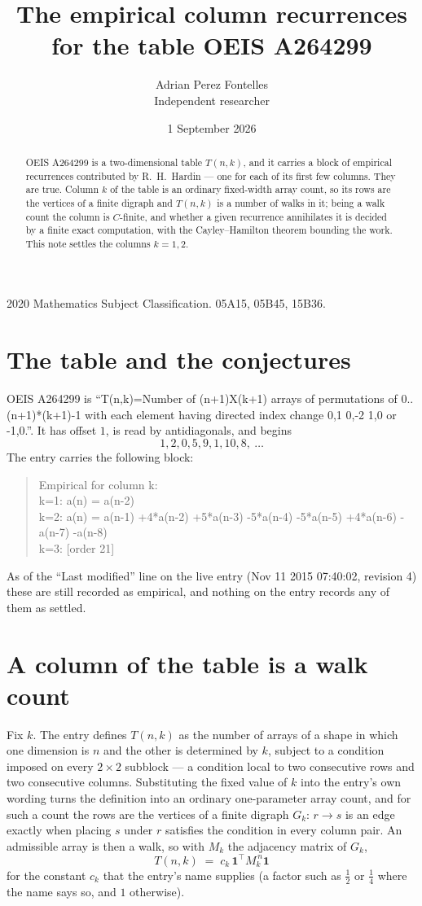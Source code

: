 \documentclass[11pt,a4paper]{article}
\title{The empirical column recurrences for the table OEIS A264299}
\author{Adrian Perez Fontelles\\ \small Independent researcher}
\date{1 September 2026}
\theoremstyle{plain}
\theoremstyle{definition}
\begin{document}
\maketitle

\begin{abstract}
OEIS A264299 is a two-dimensional table $T(n,k)$, and it carries a block of empirical
recurrences contributed by R.~H.~Hardin --- one for each of its first few columns. They are
true. Column $k$ of the table is an ordinary fixed-width array count, so its rows are the
vertices of a finite digraph and $T(n,k)$ is a number of walks in it; being a walk count the
column is $C$-finite, and whether a given recurrence annihilates it is decided by a finite
exact computation, with the Cayley--Hamilton theorem bounding the work. This note settles the columns $k=1, 2$.
\end{abstract}

\noindent\small 2020 Mathematics Subject Classification. 05A15, 05B45, 15B36.\normalsize

\section{The table and the conjectures}

OEIS A264299 is ``T(n,k)=Number of (n+1)X(k+1) arrays of permutations of 0..(n+1)*(k+1)-1 with each element having directed index change 0,1 0,-2 1,0 or -1,0.''. It has offset $1$, is
read by antidiagonals, and begins
\[
1, 2, 0, 5, 9, 1, 10, 8,\ \dots
\]
The entry carries the following block:
\begin{quote}\small
Empirical for column k:\\
k=1: a(n) = a(n-2)\\
k=2: a(n) = a(n-1) +4*a(n-2) +5*a(n-3) -5*a(n-4) -5*a(n-5) +4*a(n-6) -a(n-7) -a(n-8)\\
k=3: [order 21]\\
\end{quote}
As of the ``Last modified'' line on the live entry (Nov 11 2015 07:40:02, revision 4) these are still
recorded as empirical, and nothing on the entry records any of them as settled.

\section{A column of the table is a walk count}

Fix $k$. The entry defines $T(n,k)$ as the number of arrays of a shape in which one dimension
is $n$ and the other is determined by $k$, subject to a condition imposed on every
$2\times2$ subblock --- a condition local to two consecutive rows and two consecutive columns.
Substituting the fixed value of $k$ into the entry's own wording turns the definition into an
ordinary one-parameter array count, and for such a count the rows are the vertices of a finite
digraph $G_k$: $r\to s$ is an edge exactly when placing $s$ under $r$ satisfies the condition
in every column pair. An admissible array is then a walk, so with $M_k$ the adjacency matrix
of $G_k$,
\[
T(n,k)\;=\;c_k\,\mathbf{1}^{\!\top}M_k^{\,n}\mathbf{1}
\]
for the constant $c_k$ that the entry's name supplies (a factor such as $\tfrac12$ or
$\tfrac14$ where the name says so, and $1$ otherwise).
\end{document}
